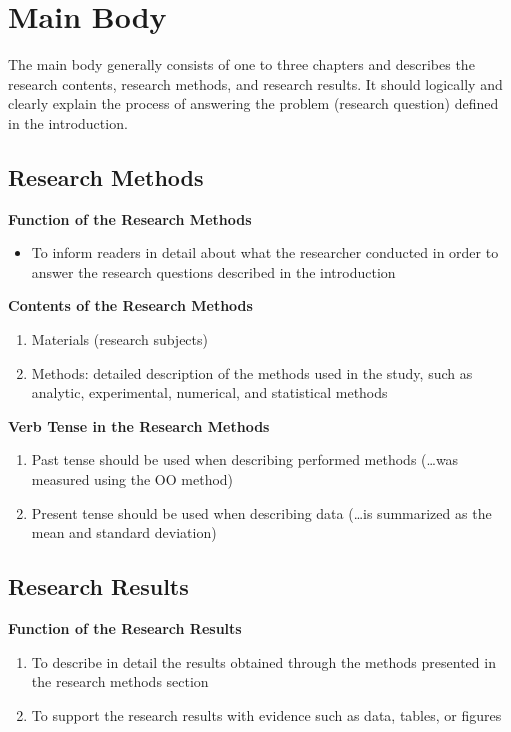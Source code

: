 \chapter{Main Body}

The main body generally consists of one to three chapters and describes the research contents, research methods, and research results. It should logically and clearly explain the process of answering the problem (research question) defined in the introduction.

\section{Research Methods}

\textbf{Function of the Research Methods}
\begin{itemize}
    \item To inform readers in detail about what the researcher conducted in order to answer the research questions described in the introduction
\end{itemize}

\textbf{Contents of the Research Methods}
\begin{enumerate}
    \item Materials (research subjects)
    \item Methods: detailed description of the methods used in the study, such as analytic, experimental, numerical, and statistical methods
\end{enumerate}

\textbf{Verb Tense in the Research Methods}
\begin{enumerate}
    \item Past tense should be used when describing performed methods (\ldots was measured using the OO method)
    \item Present tense should be used when describing data (\ldots is summarized as the mean and standard deviation)
\end{enumerate}

\section{Research Results}

\textbf{Function of the Research Results}
\begin{enumerate}
    \item To describe in detail the results obtained through the methods presented in the research methods section
    \item To support the research results with evidence such as data, tables, or figures
\end{enumerate}

